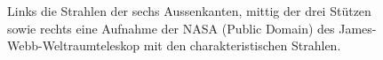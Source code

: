 \begin{figure}
    \centering

    \hfill
    \hfill
    \caption{Links die Strahlen der sechs Aussenkanten, mittig der drei Stützen sowie rechts eine Aufnahme der NASA (Public Domain)
        des James-Webb-Weltraumteleskop mit den charakteristischen Strahlen.}
    \label{opt:fig:jwst}
\end{figure}
